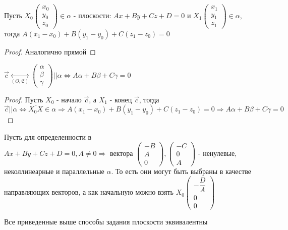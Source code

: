 \begin{proposition}
	Пусть \(X_0\begin{pmatrix}
		x_0 \\ y_0 \\ z_0
	\end{pmatrix}\in \alpha\) - плоскости: \(Ax+By+Cz+D=0\) и \(X_1\begin{pmatrix}
		x_1 \\ y_1 \\ z_1
	\end{pmatrix}\in \alpha\), тогда \(A(x_1-x_0)+B(y_1-y_0)+C(z_1-z_0) = 0\)
\end{proposition}
\begin{proof}
	Аналогично прямой
\end{proof}
\begin{corollary}
	\(\vec c \underset{(O, \mathfrak{E})}{\longleftrightarrow}
	\begin{pmatrix}
		\alpha \\ \beta \\ \gamma
	\end{pmatrix} || \alpha \Longleftrightarrow A\alpha+B\beta+C\gamma = 0\)
\end{corollary}
\begin{proof}
	Пусть \(X_0 \) - начало \(\vec c\), а \(X_1 \) - конец \(\vec c\), тогда \(\vec c || \alpha \Longleftrightarrow \overline{X_0X}\in \alpha \Longrightarrow A(x_1-x_0)+B(y_1-y_0)+C(z_1-z_0) = 0 \Longrightarrow A\alpha+B\beta+C\gamma = 0\)
\end{proof}
\begin{corollary}
	Пусть для определенности в \(Ax+By+Cz+D=0, A\ne0 \Longrightarrow \text{ вектора }\begin{pmatrix}
		-B \\ A \\ 0
	\end{pmatrix}, \begin{pmatrix}
		-C \\ 0 \\ A
	\end{pmatrix}\) - ненулевые, неколлинеарные и параллельные \(\alpha\). То есть они могут быть выбраны в качестве направляющих векторов, а как начальную можно взять \(X_0\begin{pmatrix}
		-\dfrac{D}{A} \\ 0 \\ 0
	\end{pmatrix}\)
\end{corollary}
\begin{corollary}
	Все приведенные выше способы задания плоскости эквивалентны
\end{corollary}

